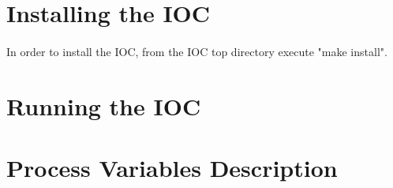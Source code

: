 \documentclass[openany]{article}
\begin{document}
\section{Installing the IOC}

	\paragraph{} In order to install the IOC, from the IOC top directory execute "make install".

	\bigskip

\section{Running the IOC}

\section{Process Variables Description}\label{sec:process-variables}
\end{document}
